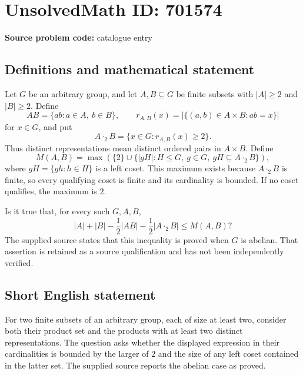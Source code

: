 \documentclass[11pt]{article}
\begin{document}
\section*{UnsolvedMath ID: 701574}
\textbf{Source problem code:} catalogue entry
\subsection{Definitions and mathematical statement}
Let \(G\) be an arbitrary group, and let \(A,B\subseteq G\) be finite subsets with \(|A|\geq 2\) and \(|B|\geq 2\). Define
\[
AB=\{ab:a\in A,\ b\in B\},\qquad
r_{A,B}(x)=\bigl|\{(a,b)\in A\times B:ab=x\}\bigr|
\]
for \(x\in G\), and put
\[
A\mathbin{\cdot_2}B=\{x\in G:r_{A,B}(x)\geq 2\}.
\]
Thus distinct representations mean distinct ordered pairs in \(A\times B\). Define
\[
M(A,B)=\max\left(\{2\}\cup
\bigl\{|gH|:H\leq G,\ g\in G,\ gH\subseteq A\mathbin{\cdot_2}B\bigr\}\right),
\]
where \(gH=\{gh:h\in H\}\) is a left coset. This maximum exists because \(A\mathbin{\cdot_2}B\) is finite, so every qualifying coset is finite and its cardinality is bounded. If no coset qualifies, the maximum is \(2\).

Is it true that, for every such \(G,A,B\),
\[
|A|+|B|-\frac12|AB|-\frac12|A\mathbin{\cdot_2}B|\leq M(A,B)?
\]
The supplied source states that this inequality is proved when \(G\) is abelian. That assertion is retained as a source qualification and has not been independently verified.
\subsection{Short English statement}
For two finite subsets of an arbitrary group, each of size at least two, consider both their product set and the products with at least two distinct representations. The question asks whether the displayed expression in their cardinalities is bounded by the larger of \(2\) and the size of any left coset contained in the latter set. The supplied source reports the abelian case as proved.
\end{document}
